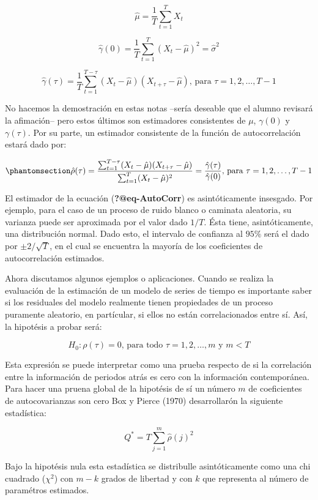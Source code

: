 \documentclass[
  a4paper,
]{article}
\begin{document}
\[
\hat{\mu} = \frac{1}{T} \sum^T_{t=1} X_t
\]

\[
\hat{\gamma}(0) = \frac{1}{T} \sum^T_{t=1} (X_t - \hat{\mu})^2 = \hat{\sigma}^2
\]

\[
\hat{\gamma}(\tau) = \frac{1}{T} \sum^{T - \tau}_{t=1} (X_t - \hat{\mu})(X_{t+\tau} - \hat{\mu}) \mbox{, para } \tau = 1, 2, \ldots, T-1
\]

No hacemos la demostración en estas notas --sería deseable que el alumno
revisará la afimación-- pero estos últimos son estimadores consistentes
de \(\mu\), \(\gamma(0)\) y \(\gamma(\tau)\). Por su parte, un estimador
consistente de la función de autocorrelación estará dado por:

\begin{equation}\phantomsection\label{eq-Eq_AutoCorr}{
\hat{\rho}(\tau) = \frac{\sum^{T - \tau}_{t=1} (X_t - \hat{\mu})(X_{t+\tau} - \hat{\mu})}{\sum^T_{t=1} (X_t - \hat{\mu})^2} = \frac{\hat{\gamma}(\tau)}{\hat{\gamma}(0)} \mbox{, para } \tau = 1, 2, \ldots, T-1
}\end{equation}

El estimador de la ecuación (\textbf{?@eq-AutoCorr}) es asintóticamente
insesgado. Por ejemplo, para el caso de un proceso de ruido blanco o
caminata aleatoria, su varianza puede ser aproximada por el valor dado
\(1/T\). Ésta tiene, asintóticamente, una distribución normal. Dado
esto, el intervalo de confianza al \(95\%\) será el dado por
\(\pm 2/\sqrt{T}\), en el cual se encuentra la mayoría de los
coeficientes de autocorrelación estimados.

Ahora discutamos algunos ejemplos o aplicaciones. Cuando se realiza la
evaluación de la estimación de un modelo de series de tiempo es
importante saber si los residuales del modelo realmente tienen
propiedades de un proceso puramente aleatorio, en partícular, si ellos
no están correlacionados entre sí. Así, la hipotésis a probar será:

\[
H_0 : \rho(\tau) = 0 \mbox{, para todo } \tau = 1, 2, \ldots, m \mbox{ y } m < T
\]

Esta expresión se puede interpretar como una prueba respecto de si la
correlación entre la información de periodos atrás es cero con la
información contemporánea. Para hacer una pruena global de la hipotésis
de sí un número \(m\) de coeficientes de autocovarianzas son cero Box y
Pierce (1970) desarrollarón la siguiente estadística:

\[
Q^* = T \sum_{j = 1}^{m} \hat{\rho} (j)^2
\]

Bajo la hipotésis nula esta estadística se distribulle asintóticamente
como una chi cuadrado (\(\chi^2\)) con \(m-k\) grados de libertad y con
\(k\) que representa al número de paramétros estimados.
\end{document}
